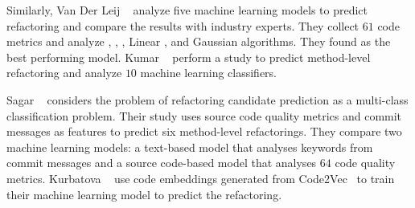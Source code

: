 Similarly, Van Der Leij \etal{}~\cite{VanDerLeij2021Data} analyze five machine learning models to predict \exm{} refactoring and compare the results with industry experts.
They collect $61$ code metrics and analyze \rf{}, \dt{}, \logr{}, Linear \SVM{}, and Gaussian \nb{} algorithms. 
They found \rf{} as the best performing model. 
Kumar \etal{}~\cite{Kumar2019Method} perform a study to predict method-level refactoring and analyze $10$ machine learning classifiers. 


Sagar \etal{}~\cite{Sagar2021Comparing} considers the problem of refactoring candidate prediction as a multi-class classification problem. 
Their study uses source code quality metrics and commit messages as features to predict six method-level refactorings. 
They compare two machine learning models: a text-based model that analyses keywords from commit messages and a source code-based model that analyses $64$ code quality metrics. 
Kurbatova \etal{}~\cite{Kurbatova2020Recommendation} use code embeddings generated from Code2Vec~\cite{Alon2019Code2vec} to train their machine learning model to predict the \mm{} refactoring. 

